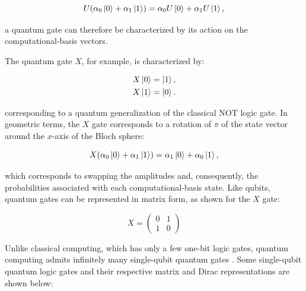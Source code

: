 \begin{center}
\begin{equation}
  U(\alpha_0\ket{0} + \alpha_1\ket{1}) = \alpha_0 U\ket{0} +\alpha_1 U\ket{1},
\end{equation}
\end{center}

\noindent a quantum gate can therefore be characterized by its action on the computational-basis vectors.

The quantum gate $X$, for example, is characterized by:

\begin{center}
\begin{equation}
\begin{aligned}
X\ket{0} &= \ket{1}, \\
X\ket{1} &= \ket{0}.
\end{aligned}
\end{equation}
\end{center}

\noindent corresponding to a quantum generalization of the classical NOT logic gate. In geometric terms, the $X$ gate corresponds to a rotation of $\pi$ of the state vector around the $x$-axis of the Bloch sphere:

\begin{center}
\begin{equation}
X (\alpha_0\ket{0} + \alpha_1\ket{1}) = \alpha_1 \ket{0} + \alpha_0 \ket{1},
\end{equation}
\end{center}

\noindent which corresponds to swapping the amplitudes and, consequently, the probabilities associated with each computational-basis state. Like qubits, quantum gates can be represented in matrix form, as shown for the $X$ gate:

\begin{center}
\begin{equation}
X =
\begin{pmatrix}
0 & 1\\
1 & 0
\end{pmatrix}
\end{equation}
\end{center}

Unlike classical computing, which has only a few one-bit logic gates, quantum computing admits infinitely many single-qubit quantum gates \cite{Nielsen}. Some single-qubit quantum logic gates and their respective matrix and Dirac representations are shown below:

